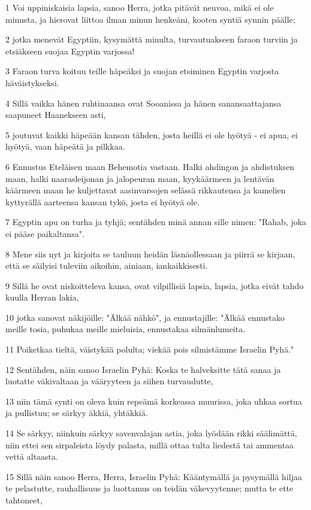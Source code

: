 \par 1 Voi uppiniskaisia lapsia, sanoo Herra, jotka pitävät neuvoa, mikä ei ole minusta, ja hierovat liittoa ilman minun henkeäni, kooten syntiä synnin päälle;
\par 2 jotka menevät Egyptiin, kysymättä minulta, turvautuakseen faraon turviin ja etsiäkseen suojaa Egyptin varjossa!
\par 3 Faraon turva koituu teille häpeäksi ja suojan etsiminen Egyptin varjosta häväistykseksi.
\par 4 Sillä vaikka hänen ruhtinaansa ovat Sooanissa ja hänen sanansaattajansa saapuneet Haanekseen asti,
\par 5 joutuvat kaikki häpeään kansan tähden, josta heillä ei ole hyötyä - ei apua, ei hyötyä, vaan häpeätä ja pilkkaa.
\par 6 Ennustus Eteläisen maan Behemotia vastaan. Halki ahdingon ja ahdistuksen maan, halki naarasleijonan ja jalopeuran maan, kyykäärmeen ja lentävän käärmeen maan he kuljettavat aasinvarsojen selässä rikkautensa ja kamelien kyttyrällä aarteensa kansan tykö, josta ei hyötyä ole.
\par 7 Egyptin apu on turha ja tyhjä; sentähden minä annan sille nimen: "Rahab, joka ei pääse paikaltansa".
\par 8 Mene siis nyt ja kirjoita se tauluun heidän läsnäollessaan ja piirrä se kirjaan, että se säilyisi tuleviin aikoihin, ainiaan, iankaikkisesti.
\par 9 Sillä he ovat niskoitteleva kansa, ovat vilpillisiä lapsia, lapsia, jotka eivät tahdo kuulla Herran lakia,
\par 10 jotka sanovat näkijöille: "Älkää nähkö", ja ennustajille: "Älkää ennustako meille tosia, puhukaa meille mieluisia, ennustakaa silmänlumeita.
\par 11 Poiketkaa tieltä, väistykää polulta; viekää pois silmistämme Israelin Pyhä."
\par 12 Sentähden, näin sanoo Israelin Pyhä: Koska te halveksitte tätä sanaa ja luotatte väkivaltaan ja vääryyteen ja siihen turvaudutte,
\par 13 niin tämä synti on oleva kuin repeämä korkeassa muurissa, joka uhkaa sortua ja pullistuu; se särkyy äkkiä, yhtäkkiä.
\par 14 Se särkyy, niinkuin särkyy savenvalajan astia, joka lyödään rikki säälimättä, niin ettei sen sirpaleista löydy palasta, millä ottaa tulta liedestä tai ammentaa vettä altaasta.
\par 15 Sillä näin sanoo Herra, Herra, Israelin Pyhä: Kääntymällä ja pysymällä hiljaa te pelastutte, rauhallisuus ja luottamus on teidän väkevyytenne; mutta te ette tahtoneet,
